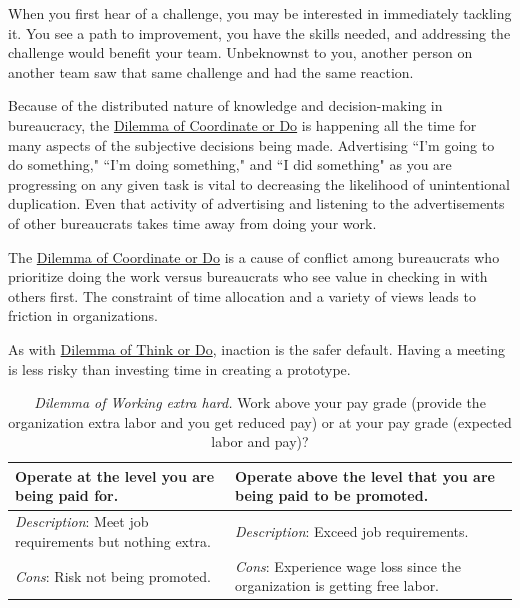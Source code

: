 When you first hear of a challenge, you may be interested in immediately tackling it. You see a path to improvement, you have the skills needed, and addressing the challenge would benefit your team. Unbeknownst to you, another person on another team saw that same challenge and had the same reaction. 

Because of the distributed nature of knowledge and decision-making in bureaucracy, the \hyperref[table:dilemma-personal-meetings-versus-work]{Dilemma of Coordinate or Do}
is happening all the time for many aspects of the subjective decisions being made. Advertising ``I'm going to do something," ``I'm doing something," and ``I did something" as you are progressing on any given task is vital to decreasing the likelihood of unintentional duplication. Even that activity of advertising and listening to the advertisements of other bureaucrats takes time away from doing your work. 

The \hyperref[table:dilemma-personal-meetings-versus-work]{Dilemma of Coordinate or Do} is a cause of conflict among bureaucrats who prioritize doing the work versus bureaucrats who see value in checking in with others first. The constraint of time allocation and a variety of views leads to friction in organizations.

As with \hyperref[table:dilemma-personal-forest-vs-trees]{Dilemma of Think or Do}, inaction is the safer default. Having a meeting is less risky than investing time in creating a prototype. 

\begin{center}
\begin{table}[H] %
\begin{tabular}{ | m{\dilemmatablewidth}| m{\dilemmatablewidth} | } 
  \hline
  \textbf{Operate at the level you are being paid for.} &
  \textbf{Operate above the level that you are being paid  to be promoted.} \\
  \hline
  \textit{Description}: Meet job requirements but nothing extra. &
  \textit{Description}: Exceed job requirements. \\
  \hline
  \textit{Cons}: Risk not being promoted. & 
  \textit{Cons}: Experience wage loss since the organization is getting free labor. \\
  \hline
\end{tabular}
\caption{\textit{Dilemma of Working extra hard.}
Work above your pay grade (provide the organization extra labor and you get reduced pay) or at your pay grade (expected labor and pay)?
}
\label{table:dilemma-personal-work-extra-or-work-as-expected}
\end{table}
\end{center}

